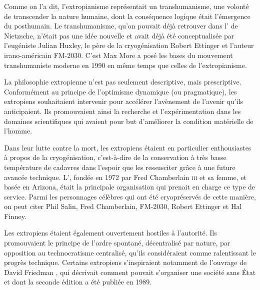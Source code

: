 Comme on l'a dit, l'extropianisme représentait un transhumanisme, une volonté de transcender la nature humaine, dont la conséquence logique était l'émergence du posthumain. Le transhumanisme, qu'on pouvait déjà retrouver dans l' de Nietzsche, n'était pas une idée nouvelle et avait déjà été conceptualisée par l'eugéniste Julian Huxley, le père de la cryogénisation Robert Ettinger et l'auteur irano-américain FM-2030. C'est Max More a posé les bases du mouvement transhumaniste moderne en 1990 en même temps que celles de l'extropianisme. %

La philosophie extropienne n'est pas seulement descriptive, mais prescriptive. Conformément au principe de l'optimisme dynamique (ou pragmatique), les extropiens souhaitaient intervenir pour accélérer l'avènement de l'avenir qu'ils anticipaient. Ils promouvaient ainsi la recherche et l'expérimentation dans les domaines scientifiques qui avaient pour but d'améliorer la condition matérielle de l'homme.

Dans leur lutte contre la mort, les extropiens étaient en particulier enthousiastes à propos de la cryogénisation, c'est-à-dire de la conservation à très basse température de cadavres dans l'espoir que les ressusciter grâce à une future avancée technique. L', fondée en 1972 par Fred Chamberlain \textsc{iii} et sa femme, et basée en Arizona, était la principale organisation qui prenait en charge ce type de service. Parmi les personnages célèbres qui ont été cryopréservés de cette manière, on peut citer Phil Salin, Fred Chamberlain, FM-2030, Robert Ettinger et Hal Finney.

Les extropiens étaient également ouvertement hostiles à l'autorité. Ils promouvaient le principe de l'ordre spontané, décentralisé par nature, par opposition au technocratisme centralisé, qu'ils considéraient comme ralentissant le progrès technique. Certains extropiens s'inspiraient notamment de l'ouvrage de David Friedman , qui décrivait comment pouvait s'organiser une société sans État et dont la seconde édition a été publiée en 1989.

